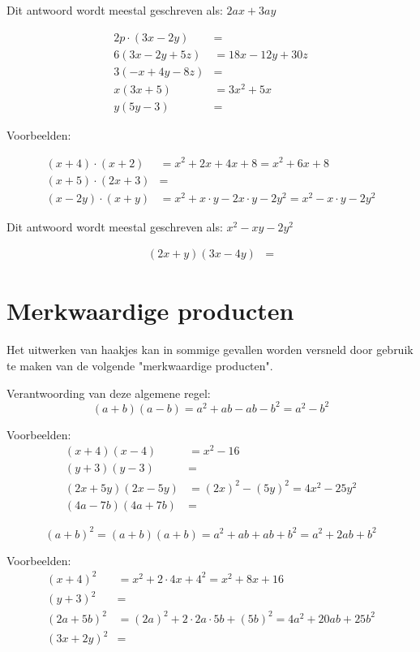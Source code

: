 Dit antwoord wordt meestal geschreven als: $2ax + 3ay$

\begin{align*}
2p \cdot (3x - 2y) &= \\
6(3x - 2y + 5z) &= 18x - 12y + 30z \\
3(-x + 4y - 8z) &= \\
x(3x + 5) &= 3x^2 + 5x \\
y(5y - 3) &=
\end{align*}


Voorbeelden:

\begin{align*}
(x + 4) \cdot (x + 2) &= x^2 + 2x + 4x + 8 = x^2 + 6x + 8 \\
(x + 5) \cdot (2x + 3) &= \\
(x - 2y) \cdot (x + y) &= x^2 + x \cdot y - 2x \cdot y - 2y^2 = x^2 - x \cdot y - 2y^2
\end{align*}

Dit antwoord wordt meestal geschreven als: $x^2 - xy - 2y^2$

\begin{align*}
(2x + y)(3x - 4y) &=
\end{align*}

\section{Merkwaardige producten}
Het uitwerken van haakjes kan in sommige gevallen worden versneld door gebruik te maken van de volgende "merkwaardige producten".


Verantwoording van deze algemene regel:
\[(a+b)(a-b)=a^2+ab-ab-b^2=a^2-b^2\]

Voorbeelden:
\begin{align*}
(x + 4)(x - 4) &= x^2 - 16 \\
(y + 3)(y - 3) &= \\
(2x + 5y)(2x - 5y) &= (2x)^2 - (5y)^2 = 4x^2 - 25y^2 \\
(4a - 7b)(4a + 7b) &=
\end{align*}

\[(a+b)^2=(a+b)(a+b)=a^2+ab+ab+b^2=a^2+2ab+b^2\]

Voorbeelden:
\begin{align*}
(x + 4)^2 &= x^2 + 2 \cdot 4x + 4^2 = x^2 + 8x + 16 \\
(y + 3)^2 &= \\
(2a + 5b)^2 &= (2a)^2 + 2 \cdot 2a \cdot 5b + (5b)^2 = 4a^2 + 20ab + 25b^2 \\
(3x + 2y)^2 &=
\end{align*}

